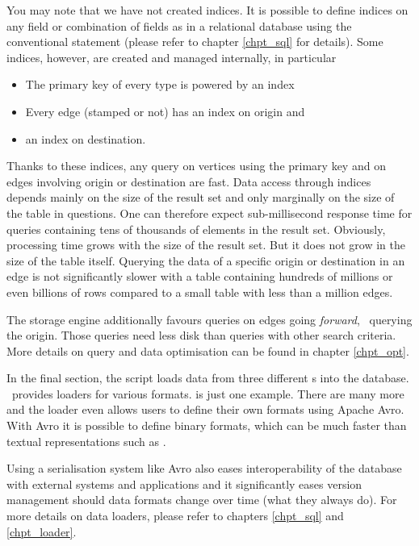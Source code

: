 You may note that we have not created indices.
It is possible to define indices on any field
or combination of fields as in a relational
database using the conventional 
statement (please refer to chapter \ref{chpt_sql}
for details). Some indices, however, are created
and managed internally, in particular

\begin{itemize}
\item The primary key of every type is powered by an index
\item Every edge (stamped or not) has an index on origin and
\item an index on destination.
\end{itemize}

Thanks to these indices, any query on vertices using
the primary key and on edges involving origin or destination
are fast.
Data access through indices
depends mainly on the size of the result set
and only marginally on the size of the table in questions.
One can therefore expect sub-millisecond response time for
queries containing tens of thousands of elements in the result set.
Obviously, processing time grows with the size of the result set.
But it does not grow in the size of the table itself.
Querying the data of a specific origin or destination in an edge
is not significantly slower with a table containing
hundreds of millions or even billions of rows compared to a small
table with less than a million edges.

The storage engine additionally favours queries
on edges going \emph{forward}, \ie\ querying the origin.
Those queries need less disk  than queries
with other search criteria. More details on query
and data optimisation can be found in chapter \ref{chpt_opt}.

In the final section,
the script loads data from three different s
into the database. \nowdb\ provides loaders
for various formats.  is just one example.
There are many more and the loader even allows 
users to define
their own formats using Apache Avro.
With Avro it is possible to define binary formats, which
can be much faster than textual representations
such as .

Using a serialisation system like Avro also eases
interoperability of the database with
external systems and applications and it
significantly eases version management should data formats
change over time (what they always do). 
For more details on data loaders, please refer to chapters
\ref{chpt_sql} and \ref{chpt_loader}.

